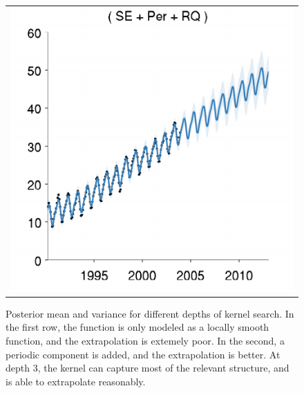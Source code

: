 \documentclass[twoside]{article}
\begin{document}
\begin{figure}[h!]
\begin{tabular}{c}
 \includegraphics[width=\wmg,height=\hmg]{../figures/decomposition/03-mauna2003-s_max_level_2/03-mauna2003-s_all_small}
\end{tabular}
\caption{Posterior mean and variance for different depths of kernel search.  In the first row, the function is only modeled as a locally smooth function, and the extrapolation is extemely poor.  In the second, a periodic component is added, and the extrapolation is better.  At depth 3, the kernel can capture most of the relevant structure, and is able to extrapolate reasonably. %
}
\label{fig:mauna_grow}
\end{figure}
\end{document}
